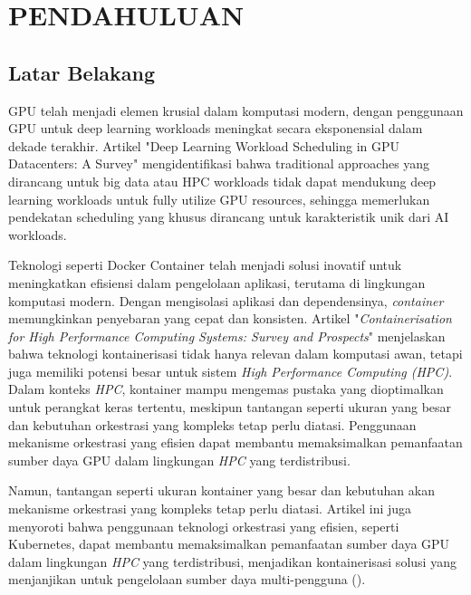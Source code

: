 \chapter{PENDAHULUAN}

\section{Latar Belakang}

GPU telah menjadi elemen krusial dalam komputasi modern, dengan penggunaan GPU 
untuk deep learning workloads meningkat secara eksponensial dalam dekade terakhir. 
Artikel "Deep Learning Workload Scheduling in GPU Datacenters: A Survey" mengidentifikasi bahwa traditional approaches yang dirancang untuk big data atau  HPC workloads tidak dapat mendukung deep learning workloads untuk fully utilize GPU resources, sehingga memerlukan pendekatan scheduling yang khusus dirancang untuk karakteristik unik dari AI workloads.

Teknologi seperti Docker Container telah menjadi solusi inovatif untuk meningkatkan efisiensi dalam pengelolaan aplikasi, terutama di lingkungan komputasi modern. Dengan mengisolasi aplikasi dan dependensinya, \emph{container} memungkinkan penyebaran yang cepat dan konsisten. Artikel "\emph{Containerisation for High Performance Computing Systems: Survey and Prospects}" menjelaskan bahwa teknologi kontainerisasi tidak hanya relevan dalam komputasi awan, tetapi juga memiliki potensi besar untuk sistem \emph{High Performance Computing (HPC)}. Dalam konteks \emph{HPC}, kontainer mampu mengemas pustaka yang dioptimalkan untuk perangkat keras tertentu, meskipun tantangan seperti ukuran yang besar dan kebutuhan orkestrasi yang kompleks tetap perlu diatasi. Penggunaan mekanisme orkestrasi yang efisien dapat membantu memaksimalkan pemanfaatan sumber daya GPU dalam lingkungan \emph{HPC} yang terdistribusi.

Namun, tantangan seperti ukuran kontainer yang besar dan kebutuhan akan mekanisme orkestrasi yang kompleks tetap perlu diatasi. Artikel ini juga menyoroti bahwa penggunaan teknologi orkestrasi yang efisien, seperti Kubernetes, dapat membantu memaksimalkan pemanfaatan sumber daya GPU dalam lingkungan \textit{HPC} yang terdistribusi, menjadikan kontainerisasi solusi yang menjanjikan untuk pengelolaan sumber daya multi-pengguna (\cite{zhou2022containerisation}).

